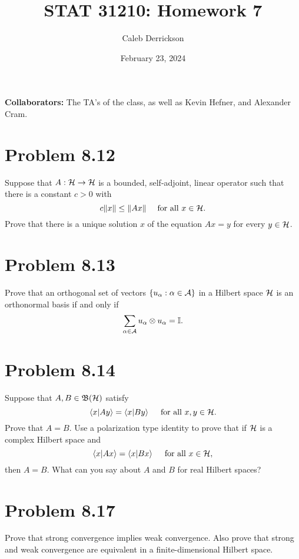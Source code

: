 

\title{STAT 31210: Homework 7}
\author{Caleb Derrickson}
\date{February 23, 2024}


\onehalfspacing
\maketitle
\allowdisplaybreaks
{\color{cit}\vspace{2mm}\noindent\textbf{Collaborators:}} The TA's of the class, as well as Kevin Hefner, and Alexander Cram.

\tableofcontents

\newpage
\section{Problem 8.12}
Suppose that $A: \mathcal{H} \rightarrow \mathcal{H}$ is a bounded, self-adjoint, linear operator such that there is a constant $c > 0$ with 
\[c \norm{x} \leq \norm{Ax} \quad \text{ for all } x \in \mathcal{H}.\]
Prove that there is a unique solution $x$ of the equation $Ax = y$ for every $y \in \mathcal{H}$.

\newpage
\section{Problem 8.13}
Prove that an orthogonal set of vectors $\{u_\alpha : \alpha \in \mathcal{A} \}$ in a Hilbert space $\mathcal{H}$ is an orthonormal basis if and only if 
\[\sum_{\alpha \in \mathcal{A}} u_\alpha \otimes u_\alpha = \mathbb{I}. \]

\newpage
\section{Problem 8.14}
Suppose that $A, B \in \mathfrak{B} (\mathcal{H})$ satisfy
\[\braket{x}{Ay} = \braket{x}{By} \quad \text{ for all } x, y \in \mathcal{H}.\]
Prove that $A = B$. Use a polarization type identity to prove that if $\mathcal{H}$ is a complex Hilbert space and 
\[\braket{x}{Ax} = \braket{x}{Bx} \quad \text{ for all } x\in \mathcal{H},\]
then $A = B$. What can you say about $A$ and $B$ for real Hilbert spaces?

\newpage
\section{Problem 8.17}
Prove that strong convergence implies weak convergence. Also prove that strong and weak convergence are equivalent in a finite-dimensional Hilbert space.

